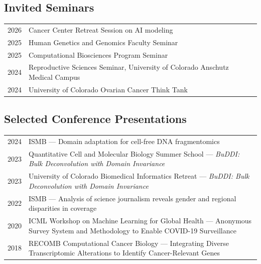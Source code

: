 
\subsection*{Invited Seminars}

\begin{tabularx}{\textwidth}{@{}p{1.5cm}X@{}}
2026 & Cancer Center Retreat Session on AI modeling \\
2025 & Human Genetics and Genomics Faculty Seminar \\
2025 & Computational Biosciences Program Seminar \\
2024 & Reproductive Sciences Seminar, University of Colorado Anschutz Medical Campus \\
2024 & University of Colorado Ovarian Cancer Think Tank \\
\end{tabularx}

\vspace{1em}

\subsection*{Selected Conference Presentations}

\begin{tabularx}{\textwidth}{@{}p{1.5cm}X@{}}
2024 & ISMB — Domain adaptation for cell-free DNA fragmentomics \\
2023 & Quantitative Cell and Molecular Biology Summer School — \textit{BuDDI: Bulk Deconvolution with Domain Invariance} \\
2023 & University of Colorado Biomedical Informatics Retreat — \textit{BuDDI: Bulk Deconvolution with Domain Invariance} \\
2022 & ISMB — Analysis of science journalism reveals gender and regional disparities in coverage \\
2020 & ICML Workshop on Machine Learning for Global Health — Anonymous Survey System and Methodology to Enable COVID-19 Surveillance \\
2018 & RECOMB Computational Cancer Biology — Integrating Diverse Transcriptomic Alterations to Identify Cancer-Relevant Genes \\
\end{tabularx}